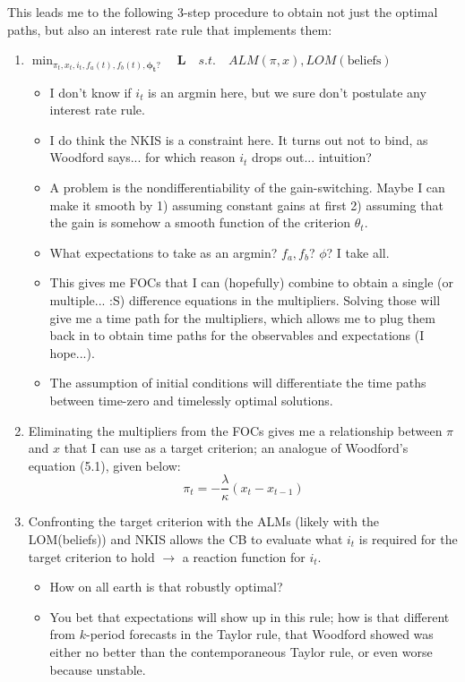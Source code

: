 \documentclass[11pt]{article}
\renewcommand{\[}{\begin{equation}}
\renewcommand{\]}{\end{equation}}
\begin{document}
This leads me to the following 3-step procedure to obtain not just the optimal paths, but also an interest rate rule that implements them:
\begin{enumerate}
\item $\min_{\pi_t, x_t, i_t, f_a(t), f_b(t),\mathbf{\phi_t?}} \quad \mathbf{L} \quad s.t. \quad  ALM(\pi,x), LOM(\text{beliefs})$
\begin{itemize}
\item I don't know if $i_t$ is an argmin here, but we sure don't postulate any interest rate rule. 
\item I do think the NKIS is a constraint here. It turns out not to bind, as Woodford says... for which reason $i_t$ drops out... intuition?
\item A problem is the nondifferentiability of the gain-switching. Maybe I can make it smooth by 1) assuming constant gains at first 2) assuming that the gain is somehow a smooth function of the criterion $\theta_t$.
\item What expectations to take as an argmin? $f_a, f_b$? $\phi$? I take all.
\item This gives me FOCs that I can (hopefully) combine to obtain a single (or multiple... :S) difference equations in the multipliers. Solving those will give me a time path for the multipliers, which allows me to plug them back in to obtain time paths for the observables and expectations (I hope...). 
\item The assumption of initial conditions will differentiate the time paths between time-zero and timelessly optimal solutions.
\end{itemize}
\item Eliminating the multipliers from the FOCs gives me a relationship between $\pi$ and $x$ that I can use as a target criterion; an analogue of Woodford's equation (5.1), given below:
\begin{equation}
\pi_t = -\frac{\lambda}{\kappa}(x_t - x_{t-1})\tag{Woodford, eq. (5.1)}
\end{equation}

\item Confronting the target criterion with the ALMs (likely with the LOM(beliefs)) and NKIS allows the CB to evaluate what $i_t$ is required for the target criterion to hold $\rightarrow$ a reaction function for $i_t$. 
	\begin{itemize}
	\item How on all earth is that robustly optimal?
	\item You bet that expectations will show up in this rule; how is that different from $k$-period forecasts in the Taylor rule, that Woodford showed was either no better than the contemporaneous Taylor rule, or even worse because unstable.
	\end{itemize}

\end{enumerate}
\end{document}
